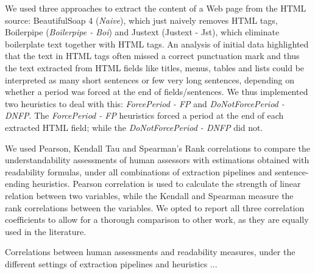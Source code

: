 We used three approaches to extract the content of a Web page from the HTML source: BeautifulSoap 4 (\textit{Naive}), which just naively removes HTML tags, Boilerpipe\cite{kohlschutter10} (\textit{Boilerpipe - Boi}) and Justext\cite{jan11} ({Justext - Jst}), which eliminate boilerplate text together with HTML tags. An analysis of initial data highlighted that the text in HTML tags often missed a correct punctuation mark and thus the text extracted from HTML fields like titles, menus, tables and lists could be interpreted as many short sentences or few very long sentences, depending on whether a period was forced at the end of fields/sentences. We thus implemented two heuristics to deal with this: \textit{ForcePeriod - FP} and \textit{DoNotForcePeriod - DNFP}. The \textit{ForcePeriod - FP} heuristics forced a period at the end of each extracted HTML field; while the \textit{DoNotForcePeriod - DNFP} did not. 

We used Pearson, Kendall Tau and Spearman's Rank correlations to compare the understandability assessments of human assessors with estimations obtained with readability formulas, under all combinations of extraction pipelines and sentence-ending heuristics. Pearson correlation is used to calculate the strength of linear relation between two variables, while the Kendall and Spearman measure the rank correlations between the variables. We opted to report all three correlation coefficients to allow for a thorough comparison to other work, as they are equally used in the literature.

Correlations between human assessments and readability measures, under the different settings of extraction pipelines and heuristics ...



